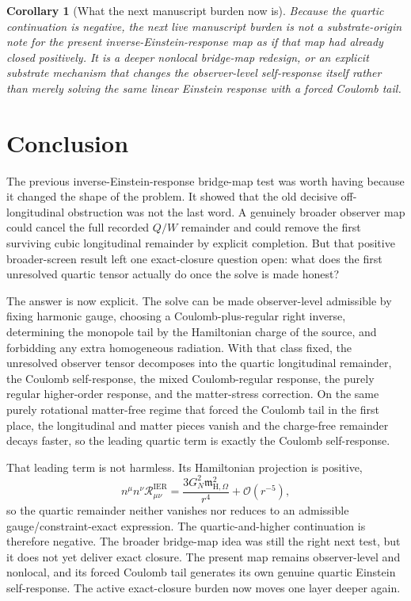 \documentclass[11pt]{article}
\newcommand{\HamChargeOmega}{\mathfrak m_{\mathrm H,\Omega}}
\newtheorem{corollary}{Corollary}
\begin{document}
\begin{corollary}[What the next manuscript burden now is]
\label{cor:next}
Because the quartic continuation is negative, the next live manuscript burden is not a substrate-origin note for the present inverse-Einstein-response map as if that map had already closed positively. It is a deeper nonlocal bridge-map redesign, or an explicit substrate mechanism that changes the observer-level self-response itself rather than merely solving the same linear Einstein response with a forced Coulomb tail.
\end{corollary}

\section{Conclusion}

The previous inverse-Einstein-response bridge-map test was worth having because it changed the shape of the problem. It showed that the old decisive off-longitudinal obstruction was not the last word. A genuinely broader observer map could cancel the full recorded \(Q/W\) remainder and could remove the first surviving cubic longitudinal remainder by explicit completion. But that positive broader-screen result left one exact-closure question open: what does the first unresolved quartic tensor actually do once the solve is made honest?

The answer is now explicit. The solve can be made observer-level admissible by fixing harmonic gauge, choosing a Coulomb-plus-regular right inverse, determining the monopole tail by the Hamiltonian charge of the source, and forbidding any extra homogeneous radiation. With that class fixed, the unresolved observer tensor decomposes into the quartic longitudinal remainder, the Coulomb self-response, the mixed Coulomb-regular response, the purely regular higher-order response, and the matter-stress correction. On the same purely rotational matter-free regime that forced the Coulomb tail in the first place, the longitudinal and matter pieces vanish and the charge-free remainder decays faster, so the leading quartic term is exactly the Coulomb self-response.

That leading term is not harmless. Its Hamiltonian projection is positive,
\[
n^\mu n^\nu \mathcal R_{\mu\nu}^{\mathrm{IER}}
=
\frac{3G_N^2\HamChargeOmega^2}{r^4}
+\mathcal O(r^{-5}),
\]
so the quartic remainder neither vanishes nor reduces to an admissible gauge/constraint-exact expression. The quartic-and-higher continuation is therefore negative. The broader bridge-map idea was still the right next test, but it does not yet deliver exact closure. The present map remains observer-level and nonlocal, and its forced Coulomb tail generates its own genuine quartic Einstein self-response. The active exact-closure burden now moves one layer deeper again.
\end{document}

